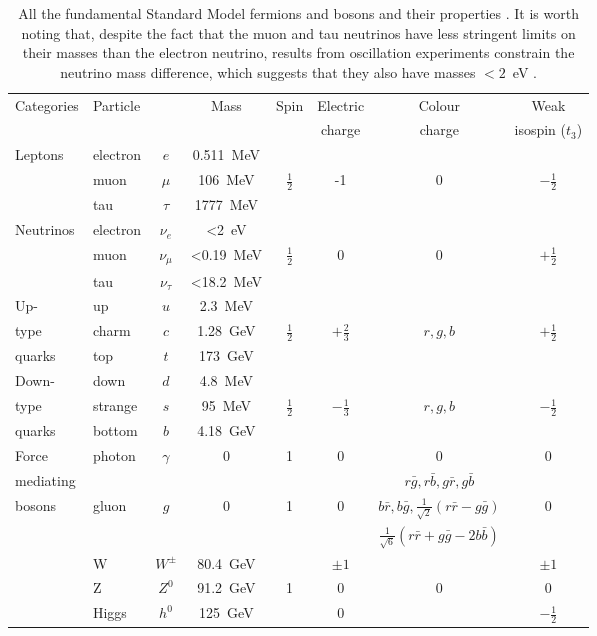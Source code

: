 \begin{table}
\begin{tabular}{l|l c|c|c|c|c|c}
Categories & Particle & & Mass & Spin & Electric & Colour & Weak \\
 &  & & & & charge & charge & isospin ($t_3$)\\
\hline
\hline
Leptons & electron & $e$ & 0.511~MeV & & & & \\
                & muon & $\mu$ & 106~MeV & $\frac{1}{2}$ & -1  & 0 &  $-\frac{1}{2}$\\
                & tau & $\tau$ & 1777~MeV  & &   &  &  \\
\hline
Neutrinos & electron & $\nu_e$ & <2~eV & & & & \\
                & muon & $\nu_{\mu}$ & <0.19~MeV & $\frac{1}{2}$  & 0  & 0 &  $+\frac{1}{2}$\\
                & tau & $\nu_{\tau}$ & <18.2~MeV &  &   &  &  \\
\hline
Up- & up & $u$ & 2.3~MeV & & & \\
type      & charm & $c$ & 1.28~GeV & $\frac{1}{2}$ & $+\frac{2}{3}$  & $r,g,b$ &  $+\frac{1}{2}$\\
quarks          & top & $t$ & 173~GeV  &   &  &  \\
\hline
Down-  & down & $d$ & 4.8~MeV & & & & \\
type & strange & $s$ & 95~MeV & $\frac{1}{2}$ & $-\frac{1}{3}$  & $r,g,b$ &  $-\frac{1}{2}$\\
quarks            & bottom & $b$ & 4.18~GeV &  &   &  &  \\
\hline
Force & photon & $\gamma$ & 0 & 1 & 0 & 0 & 0 \\
\cline{2-8}
 mediating &  &  &  &  &  & $r\bar{g},r\bar{b},g\bar{r},g\bar{b}$\\
 bosons & gluon & $g$ & 0 & 1 & 0 & $b\bar{r},b\bar{g},
\frac{1}{\sqrt{2}}(r\bar{r}-g\bar{g})$ & 0 \\
 & &  &  &  &  & $\frac{1}{\sqrt{6}}(r\bar{r}+g\bar{g}-2b\bar{b})$ &  \\
\cline{2-8}
 & W & $W^{\pm}$ & 80.4~GeV &  & $\pm 1$ &  & $\pm 1$ \\
 & Z & $Z^0$ & 91.2~GeV & 1 & 0 & 0 & 0 \\
 & Higgs & $h^0$ & 125~GeV &  & 0 &  & $-\frac{1}{2}$ \\
\end{tabular}
\caption{All the fundamental Standard Model fermions and bosons and
their properties \cite{Olive:2016xmw}. It is worth noting that, despite
the fact that the muon and tau neutrinos have less stringent limits
on their masses than the electron neutrino, results from oscillation
experiments constrain the neutrino mass difference, which suggests
that they also have masses $<2$~eV \cite{PhysRevLett.87.071301,Fukuda:1998mi}.}
\label{tab:smParticles}
\end{table}

